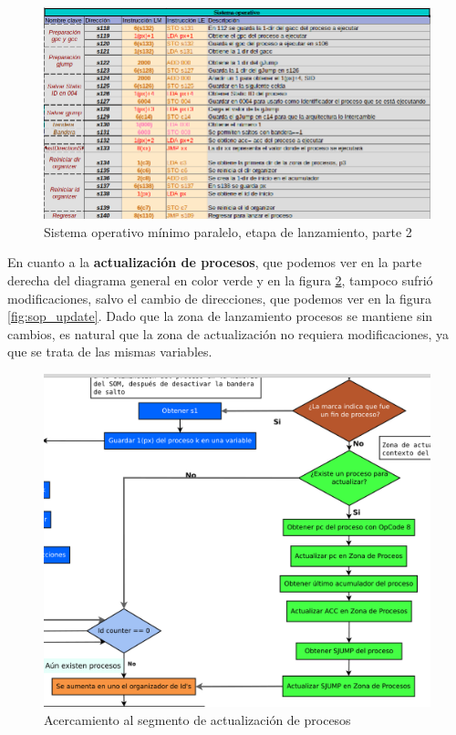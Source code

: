 \documentclass[letterpaper,12pt,oneside]{book}
\begin{document}
			
			\begin{figure}[h]		
				\centering
				\includegraphics[scale=0.5]{media/Paralela/sop_launch2.png}
				\caption{ Sistema operativo mínimo paralelo, etapa de lanzamiento, parte 2}
				\label{fig:sop_launch2}
			\end{figure}	


			En cuanto a la \textbf{actualización de procesos}, que podemos ver en la parte derecha del diagrama general en color verde
			y en la figura \ref{fig:diag_somp_update_process},
			tampoco sufrió modificaciones, salvo el cambio de direcciones, que podemos ver en la figura \ref{fig:sop_update}. 
			Dado que la zona de lanzamiento procesos
			se mantiene sin cambios, es natural que la zona de actualización no requiera modificaciones, 
			ya que se trata de las mismas variables.


			\begin{figure}[h]		
				\centering
				\includegraphics[scale=0.4]{media/Paralela/diag_somp_update_process.png}
				\caption{Acercamiento al segmento de actualización de procesos}
				\label{fig:diag_somp_update_process}
			\end{figure}
\end{document}
